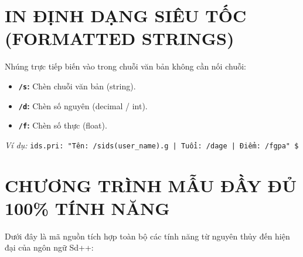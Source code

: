 \documentclass[11pt, a4paper]{article}
\begin{document}
\section{IN ĐỊNH DẠNG SIÊU TỐC (FORMATTED STRINGS)}

Nhúng trực tiếp biến vào trong chuỗi văn bản không cần nối chuỗi:
\begin{itemize}
    \item \textbf{\texttt{/s}:} Chèn chuỗi văn bản (string).
    \item \textbf{\texttt{/d}:} Chèn số nguyên (decimal / int).
    \item \textbf{\texttt{/f}:} Chèn số thực (float).
\end{itemize}

\textit{Ví dụ:} \texttt{ids.pri: "Tên: /sids(user\_name).g | Tuổi: /dage | Điểm: /fgpa" \$}

\section{CHƯƠNG TRÌNH MẪU ĐẦY ĐỦ 100\% TÍNH NĂNG}

Dưới đây là mã nguồn tích hợp toàn bộ các tính năng từ nguyên thủy đến hiện đại của ngôn ngữ Sd++:
\end{document}
